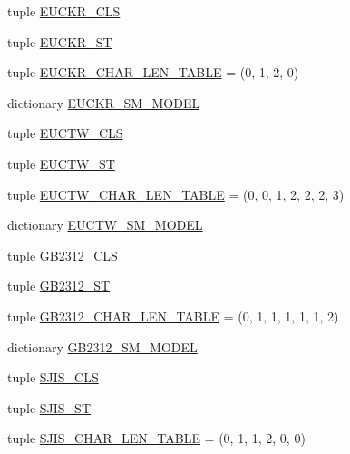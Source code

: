 \begin{DoxyCompactItemize}
\item 
tuple \hyperlink{namespacechardet_1_1mbcssm_a329d874d4c0acdf8d2b50b22231009ee}{E\+U\+C\+K\+R\+\_\+\+C\+LS}
\item 
tuple \hyperlink{namespacechardet_1_1mbcssm_a5766b728faa4048afd32f6146cbbe7fe}{E\+U\+C\+K\+R\+\_\+\+ST}
\item 
tuple \hyperlink{namespacechardet_1_1mbcssm_ae1c3936c1c1bca418ea572241d729613}{E\+U\+C\+K\+R\+\_\+\+C\+H\+A\+R\+\_\+\+L\+E\+N\+\_\+\+T\+A\+B\+LE} = (0, 1, 2, 0)
\item 
dictionary \hyperlink{namespacechardet_1_1mbcssm_ac274a327a95d575959a41247cdb2c2c8}{E\+U\+C\+K\+R\+\_\+\+S\+M\+\_\+\+M\+O\+D\+EL}
\item 
tuple \hyperlink{namespacechardet_1_1mbcssm_a2082a2502fd8847f5ed481bcb77eca80}{E\+U\+C\+T\+W\+\_\+\+C\+LS}
\item 
tuple \hyperlink{namespacechardet_1_1mbcssm_a558c7b2eb8c6458f1ab14a91bfb9e424}{E\+U\+C\+T\+W\+\_\+\+ST}
\item 
tuple \hyperlink{namespacechardet_1_1mbcssm_a04476611874b948b7377d84a20a7db01}{E\+U\+C\+T\+W\+\_\+\+C\+H\+A\+R\+\_\+\+L\+E\+N\+\_\+\+T\+A\+B\+LE} = (0, 0, 1, 2, 2, 2, 3)
\item 
dictionary \hyperlink{namespacechardet_1_1mbcssm_abc5a9ca0793e41c0164cd9d6fbd1976f}{E\+U\+C\+T\+W\+\_\+\+S\+M\+\_\+\+M\+O\+D\+EL}
\item 
tuple \hyperlink{namespacechardet_1_1mbcssm_ab49a8f349c0a4ef21a20bdd7f7232b53}{G\+B2312\+\_\+\+C\+LS}
\item 
tuple \hyperlink{namespacechardet_1_1mbcssm_ac850ca3499d445d6d9eacd571ab66edc}{G\+B2312\+\_\+\+ST}
\item 
tuple \hyperlink{namespacechardet_1_1mbcssm_a8c138b89a5164b88e0140487b590ef39}{G\+B2312\+\_\+\+C\+H\+A\+R\+\_\+\+L\+E\+N\+\_\+\+T\+A\+B\+LE} = (0, 1, 1, 1, 1, 1, 2)
\item 
dictionary \hyperlink{namespacechardet_1_1mbcssm_a03e151dc21a88783781db4e3134c0152}{G\+B2312\+\_\+\+S\+M\+\_\+\+M\+O\+D\+EL}
\item 
tuple \hyperlink{namespacechardet_1_1mbcssm_ac6b571cbe9141c3ff8ac7cc4cf17663b}{S\+J\+I\+S\+\_\+\+C\+LS}
\item 
tuple \hyperlink{namespacechardet_1_1mbcssm_a1fb9699394600576dca0a755fbabd4bb}{S\+J\+I\+S\+\_\+\+ST}
\item 
tuple \hyperlink{namespacechardet_1_1mbcssm_a34435238d54bbbb688656cefa8394ee1}{S\+J\+I\+S\+\_\+\+C\+H\+A\+R\+\_\+\+L\+E\+N\+\_\+\+T\+A\+B\+LE} = (0, 1, 1, 2, 0, 0)
\item 

\end{DoxyCompactItemize}
